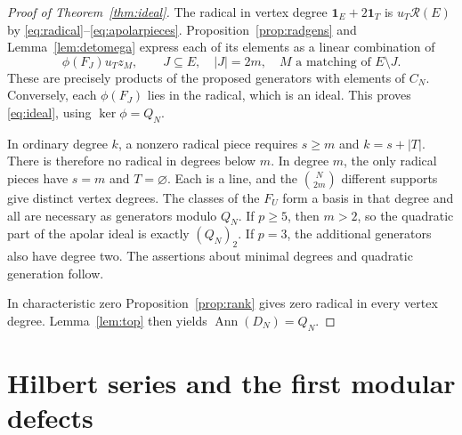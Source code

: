 \documentclass[11pt]{article}
\theoremstyle{definition}
\theoremstyle{remark}
\numberwithin{equation}{section}
\DeclareMathOperator{\Ann}{Ann}
\newcommand{\one}{\mathbf{1}}
\begin{document}
\begin{proof}[Proof of Theorem~\ref{thm:ideal}]
The radical in vertex degree $\one_E+2\one_T$ is
$u_T\mathcal R(E)$ by \eqref{eq:radical}--\eqref{eq:apolarpieces}.
Proposition~\ref{prop:radgens} and Lemma~\ref{lem:detomega} express each
of its elements as a linear combination of
\[
 \phi(F_J)u_Tz_M,
 \qquad J\subseteq E,\quad |J|=2m,
 \quad M\text{ a matching of }E\setminus J.
\]
These are precisely products of the proposed generators with elements
of $C_N$. Conversely, each $\phi(F_J)$ lies in the radical, which is an
ideal. This proves \eqref{eq:ideal}, using
$\ker\phi=Q_N$.

In ordinary degree $k$, a nonzero radical piece requires $s\geq m$ and
$k=s+|T|$. There is therefore no radical in degrees below $m$. In degree
$m$, the only radical pieces have $s=m$ and $T=\varnothing$. Each is a
line, and the $\binom{N}{2m}$ different supports give distinct vertex
degrees. The classes of the $F_U$ form a basis in that degree and all
are necessary as generators modulo $Q_N$. If $p\geq5$, then $m>2$, so
the quadratic part of the apolar ideal is exactly $(Q_N)_2$. If $p=3$,
the additional generators also have degree two. The assertions about
minimal degrees and quadratic generation follow.

In characteristic zero Proposition~\ref{prop:rank} gives zero radical
in every vertex degree. Lemma~\ref{lem:top} then yields
$\Ann(D_N)=Q_N$.
\end{proof}

\section{Hilbert series and the first modular defects}
\label{sec:examples}
\end{document}
